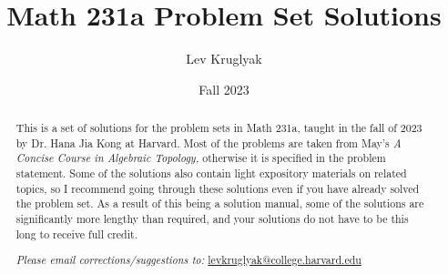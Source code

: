 \documentclass{pset}
\title{{Math 231a Problem Set Solutions}}
\date{Fall 2023}
\author{Lev Kruglyak}
\begin{document}
\maketitle

\begin{abstract}
    This is a set of solutions for the problem sets in Math 231a, taught in the fall of 2023 by Dr. Hana Jia Kong at Harvard. Most of the problems are taken from May's \emph{A Concise Course in Algebraic Topology,} otherwise it is specified in the problem statement. Some of the solutions also contain light expository materials on related topics, so I recommend going through these solutions even if you have already solved the problem set. As a result of this being a solution manual, some of the solutions are significantly more lengthy than required, and your solutions do not have to be this long to receive full credit.

    \medskip
    \begin{center}
        \emph{Please email corrections/suggestions to:} \underline{levkruglyak@college.harvard.edu}
    \end{center}
\end{abstract}
\medskip




\end{document}
